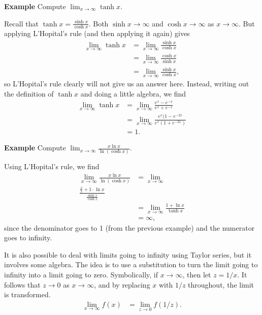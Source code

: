 \documentclass[twoside,openright,titlepage,a4paper]{book}
\begin{document}
\begin{sloppypar}
\textbf{Example} Compute $\displaystyle \lim_{x \rightarrow \infty} \tanh x$. 
\begin{examplebox}
Recall that $\tanh x = \frac{\sinh x}{\cosh x}$. Both $\sinh x \rightarrow \infty$ and $\cosh x \rightarrow \infty$ as $x \rightarrow \infty$. But applying L'Hopital's rule (and then applying it again) gives
\begin{align*}
\lim_{x \rightarrow \infty} \tanh x &= \lim_{x \rightarrow \infty} \frac{\sinh x}{\cosh x} \\
&= \lim_{x \rightarrow \infty} \frac{\cosh x}{\sinh x} \\
&= \lim_{x \rightarrow \infty} \frac{\sinh x}{\cosh x}, 
\end{align*}
so L'Hopital's rule clearly will not give us an answer here. Instead, writing out the definition of $\tanh x$ and doing a little algebra, we find
\begin{align*}
\lim_{x \rightarrow \infty} \tanh x &= \lim_{x \rightarrow \infty} \frac{e^x - e^{-x}}{e^x + e^{-x}} \\
&= \lim_{x \rightarrow \infty} \frac{e^x(1 - e^{-2x}}{e^x(1 + e^{-2x})} \\
&= 1.
\end{align*}
\end{examplebox}

\textbf{Example} Compute $ \displaystyle \lim_{x \rightarrow \infty} \frac{x \ln x}{\ln(\cosh x)}$. 
\begin{examplebox}
Using L'Hopital's rule, we find
\begin{align*}
\lim_{x \rightarrow \infty} \frac{ x \ln x}{\ln (\cosh x) } &= \lim_{x \rightarrow \infty} \\ \frac{\frac{x}{x} + 1 \cdot \ln x}{\frac{\sinh x}{\cosh x}} \\
&= \lim_{x \rightarrow \infty} \frac{1+ \ln x}{\tanh x} \\
&= \infty,
\end{align*}
since the denominator goes to 1 (from the previous example) and the numerator goes to infinity.
\end{examplebox}

It is also possible to deal with limits going to infinity using Taylor series, but it involves some algebra. The idea is to use a substitution to turn the limit going to infinity into a limit going to zero. Symbolically, if $x \rightarrow \infty$, then let $z = 1/x$. It follows that $z \rightarrow 0$ as $x \rightarrow \infty$, and by replacing $x$ with $1/z$ throughout, the limit is transformed.
\begin{align*}
\lim_{x \rightarrow \infty} f(x) &= \lim_{z \rightarrow 0} f(1/z).
\end{align*}


\end{sloppypar}
\end{document}
